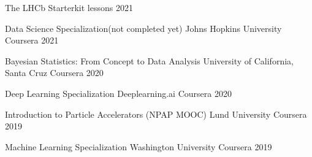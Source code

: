 

\begin{cvhonors}

            \cvhonor
            {The LHCb Starterkit lessons} %
        {} %
    {} %
    {2021} %
    
                \cvhonor
            {Data Science Specialization(not completed yet)} %
        {Johns Hopkins University Coursera} %
    {} %
    {2021} %
    
            \cvhonor
            {Bayesian Statistics: From Concept to Data Analysis} %
        {University of California, Santa Cruz Coursera} %
    {} %
    {2020} %


            \cvhonor
        {Deep Learning Specialization} %
        {Deeplearning.ai Coursera} %
    {} %
    {2020} %
    
     \cvhonor
        {Introduction to Particle Accelerators (NPAP MOOC)} %
  {Lund University Coursera} %
    {} %
    {2019} %
    
     \cvhonor
        {Machine Learning Specialization} %
  {Washington University Coursera} %
    {} %
    {2019} %
  

\end{cvhonors}
